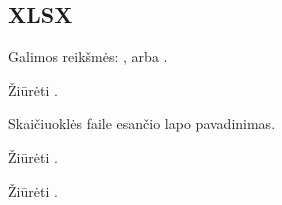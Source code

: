 \documentclass[letterpaper,10pt,lithuanian]{sphinxmanual}
\begin{document}
\subsection{XLSX}
\label{\detokenize{saltiniai:xlsx}}

\begin{fulllineitems}

\pysigstartsignatures
{}
\pysigstopsignatures
\sphinxAtStartPar
Galimos reikšmės: ,  arba .

\end{fulllineitems}



\begin{fulllineitems}

\pysigstartsignatures
{}
\pysigstopsignatures
\sphinxAtStartPar
Žiūrėti {\hyperref[\detokenize{formules:failai}]{}}.

\end{fulllineitems}



\begin{fulllineitems}

\pysigstartsignatures
{}
\pysigstopsignatures
\sphinxAtStartPar
Skaičiuoklės faile esančio lapo pavadinimas.

\end{fulllineitems}



\begin{fulllineitems}

\pysigstartsignatures
{}
\pysigstopsignatures
\sphinxAtStartPar
Žiūrėti {\hyperref[\detokenize{formules:stulpeliai-lenteleje}]{}}.

\end{fulllineitems}



\begin{fulllineitems}

\pysigstartsignatures
{}
\pysigstopsignatures
\sphinxAtStartPar
Žiūrėti {\hyperref[\detokenize{formules:stulpeliai-lenteleje}]{}}.

\end{fulllineitems}
\end{document}
